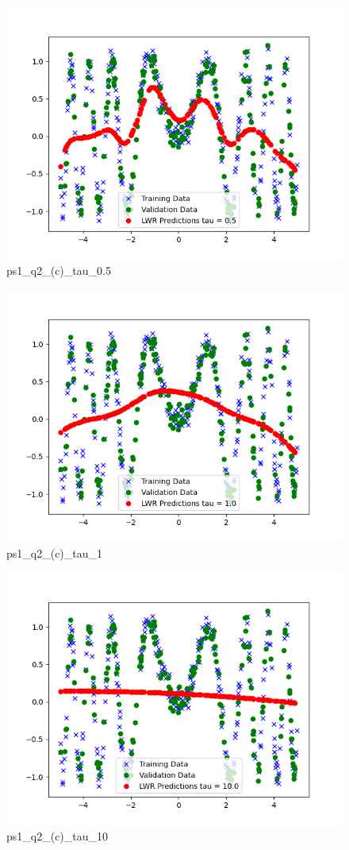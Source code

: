 \begin{answer}
\begin{figure}
    \centering
    \includegraphics[width=0.5\linewidth]{ps1_q2_(c)_tau_0.5.png}
    \caption{ps1\_q2\_(c)\_tau\_0.5}
    \label{fig:enter-label}
\end{figure}

\begin{figure}
    \centering
    \includegraphics[width=0.5\linewidth]{ps1_q2_(c)_tau_1.0.png}
    \caption{ps1\_q2\_(c)\_tau\_1}
    \label{fig:enter-label}
\end{figure}

\begin{figure}
    \centering
    \includegraphics[width=0.5\linewidth]{ps1_q2_(c)_tau_10.0.png}
    \caption{ps1\_q2\_(c)\_tau\_10}
    \label{fig:enter-label}
\end{figure}
\end{answer}
